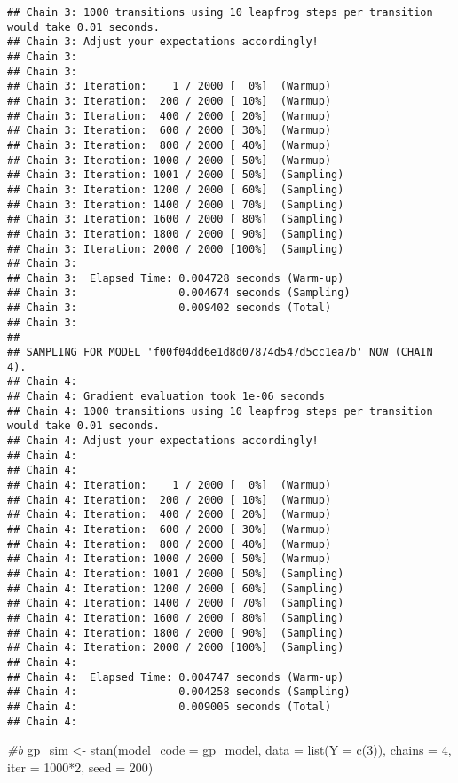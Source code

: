 \documentclass[
]{article}
\newenvironment{Shaded}{\begin{snugshade}}{\end{snugshade}}
\newcommand{\AttributeTok}[1]{\textcolor[rgb]{0.77,0.63,0.00}{#1}}
\newcommand{\CommentTok}[1]{\textcolor[rgb]{0.56,0.35,0.01}{\textit{#1}}}
\newcommand{\DecValTok}[1]{\textcolor[rgb]{0.00,0.00,0.81}{#1}}
\newcommand{\FunctionTok}[1]{\textcolor[rgb]{0.00,0.00,0.00}{#1}}
\newcommand{\NormalTok}[1]{#1}
\newcommand{\OtherTok}[1]{\textcolor[rgb]{0.56,0.35,0.01}{#1}}
\newcommand{\SpecialCharTok}[1]{\textcolor[rgb]{0.00,0.00,0.00}{#1}}
\begin{document}
\begin{verbatim}
## Chain 3: 1000 transitions using 10 leapfrog steps per transition would take 0.01 seconds.
## Chain 3: Adjust your expectations accordingly!
## Chain 3: 
## Chain 3: 
## Chain 3: Iteration:    1 / 2000 [  0%]  (Warmup)
## Chain 3: Iteration:  200 / 2000 [ 10%]  (Warmup)
## Chain 3: Iteration:  400 / 2000 [ 20%]  (Warmup)
## Chain 3: Iteration:  600 / 2000 [ 30%]  (Warmup)
## Chain 3: Iteration:  800 / 2000 [ 40%]  (Warmup)
## Chain 3: Iteration: 1000 / 2000 [ 50%]  (Warmup)
## Chain 3: Iteration: 1001 / 2000 [ 50%]  (Sampling)
## Chain 3: Iteration: 1200 / 2000 [ 60%]  (Sampling)
## Chain 3: Iteration: 1400 / 2000 [ 70%]  (Sampling)
## Chain 3: Iteration: 1600 / 2000 [ 80%]  (Sampling)
## Chain 3: Iteration: 1800 / 2000 [ 90%]  (Sampling)
## Chain 3: Iteration: 2000 / 2000 [100%]  (Sampling)
## Chain 3: 
## Chain 3:  Elapsed Time: 0.004728 seconds (Warm-up)
## Chain 3:                0.004674 seconds (Sampling)
## Chain 3:                0.009402 seconds (Total)
## Chain 3: 
## 
## SAMPLING FOR MODEL 'f00f04dd6e1d8d07874d547d5cc1ea7b' NOW (CHAIN 4).
## Chain 4: 
## Chain 4: Gradient evaluation took 1e-06 seconds
## Chain 4: 1000 transitions using 10 leapfrog steps per transition would take 0.01 seconds.
## Chain 4: Adjust your expectations accordingly!
## Chain 4: 
## Chain 4: 
## Chain 4: Iteration:    1 / 2000 [  0%]  (Warmup)
## Chain 4: Iteration:  200 / 2000 [ 10%]  (Warmup)
## Chain 4: Iteration:  400 / 2000 [ 20%]  (Warmup)
## Chain 4: Iteration:  600 / 2000 [ 30%]  (Warmup)
## Chain 4: Iteration:  800 / 2000 [ 40%]  (Warmup)
## Chain 4: Iteration: 1000 / 2000 [ 50%]  (Warmup)
## Chain 4: Iteration: 1001 / 2000 [ 50%]  (Sampling)
## Chain 4: Iteration: 1200 / 2000 [ 60%]  (Sampling)
## Chain 4: Iteration: 1400 / 2000 [ 70%]  (Sampling)
## Chain 4: Iteration: 1600 / 2000 [ 80%]  (Sampling)
## Chain 4: Iteration: 1800 / 2000 [ 90%]  (Sampling)
## Chain 4: Iteration: 2000 / 2000 [100%]  (Sampling)
## Chain 4: 
## Chain 4:  Elapsed Time: 0.004747 seconds (Warm-up)
## Chain 4:                0.004258 seconds (Sampling)
## Chain 4:                0.009005 seconds (Total)
## Chain 4:
\end{verbatim}

\begin{Shaded}
\begin{Highlighting}[]
\CommentTok{\#b}
\NormalTok{gp\_sim }\OtherTok{\textless{}{-}} \FunctionTok{stan}\NormalTok{(}\AttributeTok{model\_code =}\NormalTok{ gp\_model, }\AttributeTok{data =} \FunctionTok{list}\NormalTok{(}\AttributeTok{Y =} \FunctionTok{c}\NormalTok{(}\DecValTok{3}\NormalTok{)), }
               \AttributeTok{chains =} \DecValTok{4}\NormalTok{, }\AttributeTok{iter =} \DecValTok{1000}\SpecialCharTok{*}\DecValTok{2}\NormalTok{, }\AttributeTok{seed =} \DecValTok{200}\NormalTok{)}
\end{Highlighting}
\end{Shaded}
\end{document}
